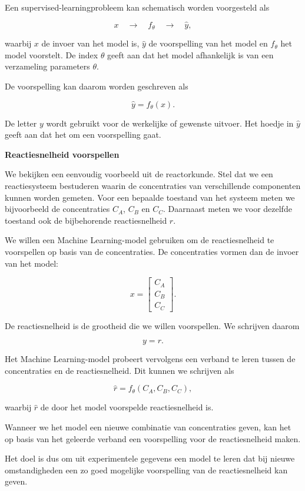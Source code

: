 \documentclass{ximera}
\begin{document}
Een supervised-learningprobleem kan schematisch worden voorgesteld als

\[
x
\quad\longrightarrow\quad
\boxed{f_\theta}
\quad\longrightarrow\quad
\hat{y},
\]

waarbij $x$ de invoer van het model is, $\hat{y}$ de voorspelling van het model en $f_\theta$ het model voorstelt. De index $\theta$ geeft aan dat het model afhankelijk is van een verzameling parameters $\theta$.

De voorspelling kan daarom worden geschreven als

\[
\hat{y}=f_\theta(x).
\]

De letter $y$ wordt gebruikt voor de werkelijke of gewenste uitvoer. Het hoedje in $\hat{y}$ geeft aan dat het om een voorspelling gaat.

\begin{example} \textbf{Reactiesnelheid voorspellen}

We bekijken een eenvoudig voorbeeld uit de reactorkunde. Stel dat we een reactiesysteem bestuderen waarin de concentraties van verschillende componenten kunnen worden gemeten. Voor een bepaalde toestand van het
systeem meten we bijvoorbeeld de concentraties $C_A$, $C_B$ en $C_C$.
Daarnaast meten we voor dezelfde toestand ook de bijbehorende reactiesnelheid $r$.

We willen een Machine Learning-model gebruiken om de reactiesnelheid te voorspellen op basis van de concentraties. De concentraties vormen dan de invoer van het model:

\[
x=
\begin{bmatrix}
C_A\\
C_B\\
C_C
\end{bmatrix}.
\]

De reactiesnelheid is de grootheid die we willen voorspellen. We schrijven daarom

\[
y=r.
\]

Het Machine Learning-model probeert vervolgens een verband te leren tussen de concentraties en de reactiesnelheid. Dit kunnen we schrijven
als

\[
\hat{r}
=
f_\theta(C_A,C_B,C_C),
\]

waarbij $\hat{r}$ de door het model voorspelde reactiesnelheid is.

Wanneer we het model een nieuwe combinatie van concentraties geven, kan het op basis van het geleerde verband een voorspelling voor de
reactiesnelheid maken.

Het doel is dus om uit experimentele gegevens een model te leren dat bij nieuwe omstandigheden een zo goed mogelijke voorspelling van de reactiesnelheid kan geven.
\end{example}
\text{ } \\
\end{document}

